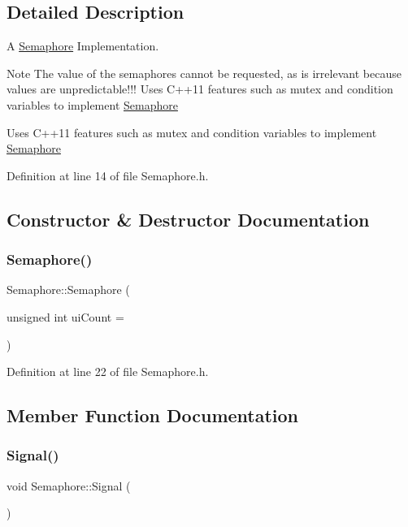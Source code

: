 \subsection{Detailed Description}
A \hyperlink{class_semaphore}{Semaphore} Implementation. 

\begin{DoxyNote}{Note}
The value of the semaphores cannot be requested, as is irrelevant because values are unpredictable!!! Uses C++11 features such as mutex and condition variables to implement \hyperlink{class_semaphore}{Semaphore}
\end{DoxyNote}
Uses C++11 features such as mutex and condition variables to implement \hyperlink{class_semaphore}{Semaphore} 

Definition at line 14 of file Semaphore.\+h.



\subsection{Constructor \& Destructor Documentation}
\mbox{\label{class_semaphore_a0d9290d316636875ca85d1d78950a817}} 
\subsubsection{\texorpdfstring{Semaphore()}{Semaphore()}}
{\footnotesize\ttfamily Semaphore\+::\+Semaphore (\begin{DoxyParamCaption}\item[{unsigned int}]{ui\+Count = {} }\end{DoxyParamCaption})\hspace{0.3cm}{\ttfamily [inline]}}



Definition at line 22 of file Semaphore.\+h.



\subsection{Member Function Documentation}
\mbox{\label{class_semaphore_a86f92f738b4486439b296d8e235895f2}} 
\subsubsection{\texorpdfstring{Signal()}{Signal()}}
{\footnotesize\ttfamily void Semaphore\+::\+Signal (\begin{DoxyParamCaption}{ }\end{DoxyParamCaption})}



